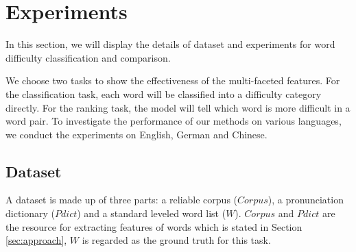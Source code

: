 \section{Experiments}
\label{sec:eval}

In this section, we will display the details of dataset and experiments for word difficulty classification and comparison.

We choose two tasks to show the effectiveness of the multi-faceted features. For the classification task, each word will be classified into a difficulty category directly. For the ranking task, the model will tell which word is more difficult in a word pair.
To investigate the performance of our methods on various languages, we conduct the experiments on English, German and Chinese.

\subsection{Dataset}
\label{sec:data}
A dataset is made up of three parts: a reliable corpus ($Corpus$), a pronunciation dictionary ($Pdict$) and a standard leveled word list ($W$). $Corpus$ and $Pdict$ are the resource for extracting features of words which is stated in Section \ref{sec:approach}, $W$ is regarded as the ground truth for this task.

